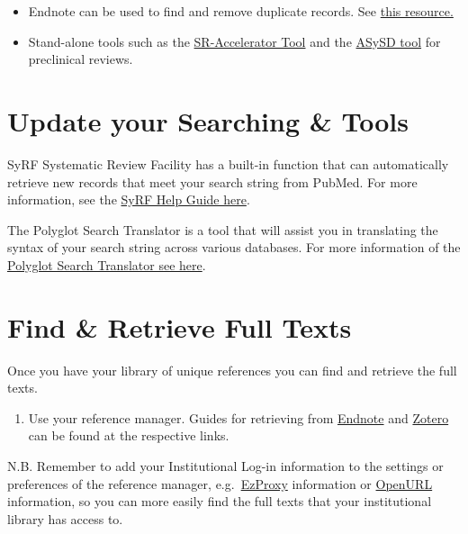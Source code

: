\documentclass[
]{book}
\providecommand{\tightlist}{%
  \setlength{\itemsep}{0pt}\setlength{\parskip}{0pt}}
\begin{document}
\begin{itemize}
\tightlist
\item
  Endnote can be used to find and remove duplicate records. See \href{10.3163/1536-5050.104.3.014}{this resource.}
\item
  Stand-alone tools such as the \href{https://doi.org/10.1186/2046-4053-4-6}{SR-Accelerator Tool} and the \href{https://camarades.shinyapps.io/RDedup/}{ASySD tool} for preclinical reviews.
\end{itemize}

\hypertarget{update-your-searching-tools}{%
\section{Update your Searching \& Tools}\label{update-your-searching-tools}}

SyRF Systematic Review Facility has a built-in function that can automatically retrieve new records that meet your search string from PubMed. For more information, see the \href{https://assets.syrf.org.uk/guides/SyRF_User_Guide.pdf}{SyRF Help Guide here}.

The Polyglot Search Translator is a tool that will assist you in translating the syntax of your search string across various databases. For more information of the \href{https://sr-accelerator.com/\#/polyglot}{Polyglot Search Translator see here}.

\hypertarget{find-retrieve-full-texts}{%
\section{Find \& Retrieve Full Texts}\label{find-retrieve-full-texts}}

Once you have your library of unique references you can find and retrieve the full texts.

\begin{enumerate}
\def\labelenumi{\arabic{enumi}.}
\tightlist
\item
  Use your reference manager. Guides for retrieving from \href{https://subjectguides.library.american.edu/c.php?g=479020\&p=3324236}{Endnote} and \href{https://www.zotero.org/support/locate}{Zotero} can be found at the respective links.
\end{enumerate}

N.B. Remember to add your Institutional Log-in information to the settings or preferences of the reference manager, e.g.~\href{https://ezproxy-db.appspot.com/}{EzProxy} information or \href{https://www.zotero.org/support/locate/openurl_resolvers}{OpenURL} information, so you can more easily find the full texts that your institutional library has access to.
\end{document}
